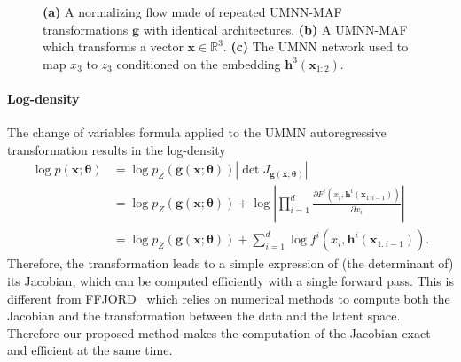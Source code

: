\documentclass{article}
\newcommand{\mb}{\boldsymbol}
\newcommand{\mbb}{\mathbb}
\newcommand{\gilles}[1]{\textcolor{red}{[GL: #1]}}
\newcommand{\tbf}[1]{\textbf{#1}}
\begin{document}
\begin{figure}
\caption{\tbf{(a)} A normalizing flow made of repeated UMNN-MAF transformations $\mb{g}$ with identical architectures. \tbf{(b)} A UMNN-MAF which transforms a vector $\mb{x}\in \mbb{R}^3$. \tbf{(c)} The UMNN network used to map $x_3$ to $z_3$ conditioned on the embedding $\mb{h}^3(\mb{x}_{1:2})$.}
\label{fig:architecture}
\end{figure}
\vspace{-1em}



\paragraph{Log-density}
The change of variables formula applied to the UMMN autoregressive transformation results in the log-density
\begin{align}
    \log p(\mb{x}; \mb{\theta}) &= \log p_Z(\mb{g}(\mb{x}; \mb{\theta}))  \left|\det J_{\mb{g}(\mb{x};\mb{\theta})} \right|  \nonumber\\
    &=\log p_Z(\mb{g}(\mb{x}; \mb{\theta}))  + \log\left|\prod^d_{i=1} \frac{\partial F^i(x_i, \mb{h}^i(\mb{x}_{1 : i-1}))}{\partial x_i}\right| \nonumber\\
    &=\log p_Z(\mb{g}(\mb{x}; \mb{\theta}))   + \sum^d_{i=1} \log f^i(x_i, \mb{h}^i(\mb{x}_{1 : i-1})).
\end{align}
Therefore, the transformation leads to a simple expression of (the determinant of) its Jacobian, which can be  computed efficiently with a single forward pass. This is different from FFJORD~\citep{ffjord} which relies on numerical methods to compute both the Jacobian and the transformation between the data and the latent space. Therefore our proposed method makes the computation of the Jacobian exact and efficient at the same time.
\end{document}
